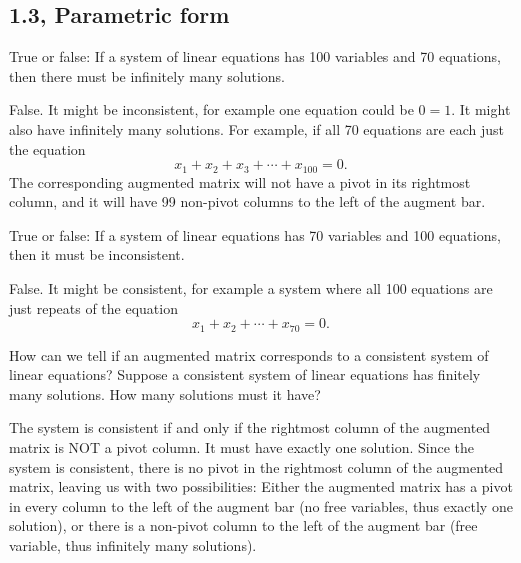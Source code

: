 \newpage

\subsection{1.3, Parametric form}

\begin{problems}
  \problem %
  True or false: If a system of linear equations has 100 variables and 70
  equations, then there must be infinitely many solutions.
  
\begin{solution}
  False.  It might be inconsistent, for example one equation could be $0 = 1$.
  It might also have infinitely many solutions.  For example, if all 70
  equations are each just the equation
  \[x_1 + x_2 + x_3 + \cdots + x_{100} = 0.\] The corresponding augmented matrix
  will not have a pivot in its rightmost column, and it will have 99 non-pivot
  columns to the left of the augment bar.
\end{solution}


\problem %
True or false: If a system of linear equations has 70 variables and 100
equations, then it must be inconsistent.

\begin{solution}
  False.  It might be consistent, for example a system where all 100 equations
  are just repeats of the equation
    \[x_1 + x_2 + \cdots + x_{70} = 0.\]
\end{solution}



\problem %
\begin{subproblems}
  \subproblem How can we tell if an augmented matrix corresponds to a consistent
  system of linear equations?  \subproblem Suppose a consistent system of linear
  equations has finitely many solutions.  How many solutions must it have?
\end{subproblems}
\begin{solution}
\begin{subproblems}
  \subproblem The system is consistent if and only if the rightmost column of
  the augmented matrix is NOT a pivot column.  %
  \subproblem It must have exactly one solution.  Since the system is
  consistent, there is no pivot in the rightmost column of the augmented matrix,
  leaving us with two possibilities: Either the augmented matrix has a pivot in
  every column to the left of the augment bar (no free variables, thus exactly
  one solution), or there is a non-pivot column to the left of the augment bar
  (free variable, thus infinitely many solutions).
\end{subproblems}
\end{solution}


\end{problems}
